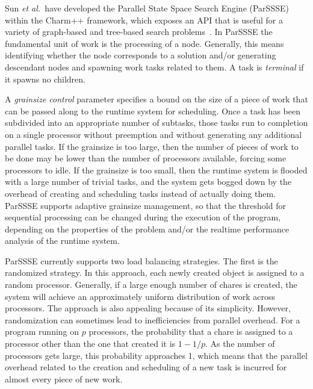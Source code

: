 \documentclass[10pt, conference, compsocconf]{IEEEtran}
\newcommand{\etal}{{\em et al.}\ }
\begin{document}
Sun \etal have developed the Parallel State Space Search Engine ({\sc ParSSSE})
within the {\sc Charm++} framework, which exposes an API that is useful for a
variety of graph-based and tree-based search problems~\cite{sun11adaptive}. In
{\sc ParSSSE} the fundamental unit of work is the processing of a node.
Generally, this means identifying whether the node corresponds to a solution
and/or generating descendant nodes and spawning work tasks related to them. A
task is {\em terminal} if it spawns no children. 

A {\em grainsize control} parameter specifies a bound on the size of a piece of
work that can be passed along to the runtime system for scheduling.  Once a
task has been subdivided into an appropriate number of subtasks, those tasks
run to completion on a single processor without preemption and without generating
any additional parallel tasks.  If the grainsize is too large, then the number
of pieces of work to be done may be lower than the number of processors
available, forcing some processors to idle.  If the grainsize is too small,
then the runtime system is flooded with a large number of trivial tasks, and
the system gets bogged down by the overhead of creating and scheduling tasks
instead of actually doing them.  {\sc ParSSSE} supports adaptive grainsize
management, so that the threshold for sequential processing can be changed
during the execution of the program, depending on the properties of the problem
and/or the realtime performance analysis of the runtime system.

{\sc ParSSSE} currently supports two load balancing strategies.  The
first is the randomized strategy.  In this approach, each newly created object
is assigned to a random processor.  Generally, if a large enough number of 
chares is created, the system will achieve an approximately uniform
distribution of work across processors.  The approach is also appealing because
of its simplicity. However, randomization can sometimes lead to inefficiencies
from parallel overhead.  For a program running on $p$ processors, the
probability that a chare is assigned to a processor other than the
one that created it is $1-1/p$.  As the number of processors gets large, this
probability approaches 1, which means that the parallel overhead related to the
creation and scheduling of a new task is incurred for almost every piece of new
work.
 
\end{document}
